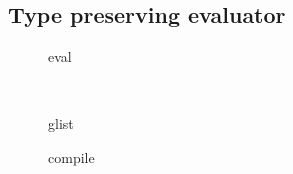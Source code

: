 \documentclass{llncs}
\begin{document}
\subsection{Type preserving evaluator}

\begin{landscape}
\begin{figure}
\hspace*{-6ex}
\begin{minipage}{.31\linewidth}\end{minipage}
\begin{minipage}{.35\linewidth}\end{minipage}
\begin{minipage}{.33\linewidth}\end{minipage}
\caption{eval}
\end{figure}

\begin{figure}
\hspace*{-10ex}
\begin{minipage}{.3\linewidth}\end{minipage}
\begin{minipage}{.39\linewidth}\end{minipage}
\begin{minipage}{.33\linewidth}\end{minipage} \\
\hspace*{-10ex}
\begin{minipage}{.3\linewidth}\end{minipage}
\begin{minipage}{.39\linewidth}\end{minipage}
\begin{minipage}{.33\linewidth}\end{minipage}
\caption{glist}
\end{figure}

\begin{figure}
\hspace*{-10ex}
\begin{minipage}{.33\linewidth}\end{minipage}
\begin{minipage}{.40\linewidth}\end{minipage}
\begin{minipage}{.33\linewidth}\end{minipage}
\caption{compile}
\end{figure}

\end{landscape}
\end{document}
